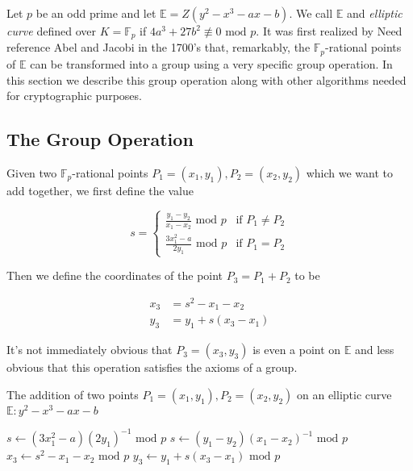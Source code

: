 

Let $p$ be an odd prime and let $\mathbb{E} = Z( y^2 - x^3 - ax - b)$. We call $\mathbb{E}$ and \textit{elliptic curve} defined over $K = \mathbb{F}_p$ if $4a^3 + 27b^2 \not\equiv 0 \text{ mod } p$. It was first realized by {\color{red}Need reference} Abel and Jacobi in the 1700's that, remarkably, the $\mathbb{F}_p$-rational points of $\mathbb{E}$ can be transformed into a group using a very specific group operation. In this section we describe this group operation along with other algorithms needed for cryptographic purposes. 

\subsection{The Group Operation}  

Given two $\mathbb{F}_p$-rational points $P_1 = (x_1,y_1),P_2=(x_2,y_2)$ which we want to add together, we first define the value 

$$ s =
\begin{cases}
\frac{y_1 - y_2}{x_1 - x_2} \text{ mod } p 	&\text{if } P_1 \neq P_2 \\
\frac{3x_1^2 - a}{2y_1} 	\text{ mod } p	&\text{if } P_1 = P_2 
\end{cases} 
$$ 

Then we define the coordinates of the point $P_3 = P_1 + P_2 $ to be 

\begin{align*}
	x_3 &= s^2 - x_1 - x_2  \\ 
	y_3 &= y_1 + s(x_3 - x_1) 
\end{align*}

It's not immediately obvious that $P_3 = (x_3,y_3)$ is even a point on $\mathbb{E}$ and less obvious that this operation satisfies the axioms of a group.  \\

\begin{algorithm} 
	\caption{The addition of two points $P_1 = (x_1,y_1),P_2 = (x_2,y_2)$ on an elliptic curve $\mathbb{E} : y^2 - x^3 - ax - b$}
	\begin{algorithmic}[1]
				\State {}
				\State {}
				\State $ s \leftarrow (3x_1^2 - a)(2y_1)^{-1} \text { mod } p $
		  	\Else
	  				\State $ s \leftarrow (y_1 - y_2)(x_1 - x_2)^{-1} \text{ mod }p $
	  			\Else
	  				\State {}
	  			\EndIf
	  		\EndIf 
	  		\State $ x_3 \leftarrow s^2 - x_1 -x_2 \text{ mod } p $
	  		\State $ y_3 \leftarrow  y_1 + s(x_3 - x_1) \text{ mod } p $ 
	  		\State {}
	  	\EndFunction
	\end{algorithmic} 
\end{algorithm} 

